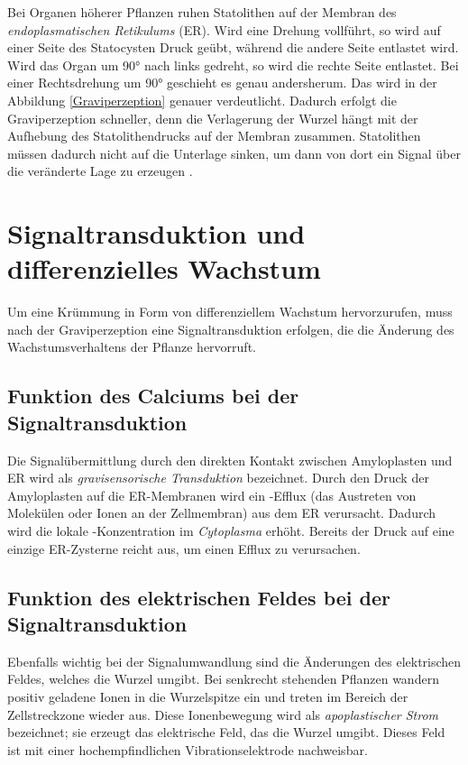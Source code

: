 \documentclass[
11pt, 
ngerman,
listof=totocnumbered,
oneside,
bibliography=totocnumbered,
abstracton
]{scrreprt}
\begin{document}
Bei Organen höherer Pflanzen ruhen Statolithen auf der Membran des \emph{endoplasmatischen Retikulums} (ER). Wird eine Drehung vollführt, so wird auf einer Seite des Statocysten Druck geübt, während die andere Seite entlastet wird. Wird das Organ um \ang{90} nach links gedreht, so wird die rechte Seite entlastet. Bei einer Rechtsdrehung um \ang{90} geschieht es genau andersherum. Das wird in der Abbildung \ref{Graviperzeption} genauer verdeutlicht.
Dadurch erfolgt die Graviperzeption schneller, denn die Verlagerung der Wurzel hängt mit der Aufhebung des Statolithendrucks auf der Membran zusammen. Statolithen müssen dadurch nicht auf die Unterlage sinken, um dann von dort ein Signal über die veränderte Lage zu erzeugen \parencite[531--532]{Luettge}. 


\section{Signaltransduktion und differenzielles Wachstum}

Um eine Krümmung in Form von differenziellem Wachstum hervorzurufen, muss nach der Graviperzeption eine Signaltransduktion erfolgen, die die Änderung des Wachstumsverhaltens der Pflanze hervorruft. 

\subsection{Funktion des Calciums bei der Signaltransduktion}

Die Signalübermittlung durch den direkten Kontakt zwischen Amyloplasten und ER wird als \emph{gravisensorische Transduktion} bezeichnet.
Durch den Druck der Amyloplasten auf die ER-Membranen wird ein -Efflux (das Austreten von Molekülen oder Ionen an der Zellmembran) aus dem ER verursacht.
Dadurch wird die lokale -Konzentration im  \emph{Cytoplasma} erhöht. 
Bereits der Druck auf eine einzige ER-Zysterne reicht aus, um einen Efflux zu verursachen.

\subsection{Funktion des elektrischen Feldes bei der Signaltransduktion}

Ebenfalls wichtig bei der Signalumwandlung sind die Änderungen des elektrischen Feldes, welches die Wurzel umgibt.
Bei senkrecht stehenden Pflanzen wandern positiv geladene Ionen in die Wurzelspitze ein und treten im Bereich der Zellstreckzone wieder aus. Diese Ionenbewegung wird als \emph{apoplastischer Strom} bezeichnet; sie erzeugt das elektrische Feld, das die Wurzel umgibt. Dieses Feld ist mit einer hochempfindlichen Vibrationselektrode nachweisbar. 
\end{document}

